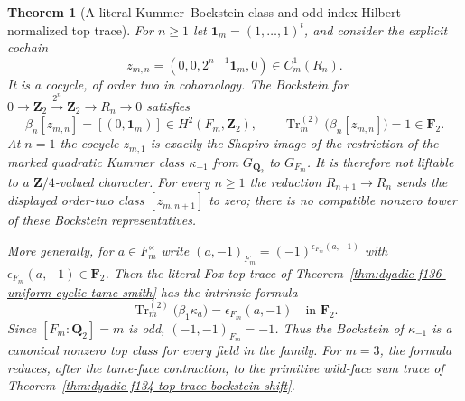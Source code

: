 \documentclass[11pt]{article}
\newtheorem{theorem}{Theorem}[section]
\theoremstyle{definition}
\begin{document}
\begin{theorem}[A literal Kummer--Bockstein class and odd-index
Hilbert-normalized top trace]
\label{thm:dyadic-f137-kummer-bockstein-hilbert}
For $n\ge1$ let $\mathbf1_m=(1,\ldots,1)^t$,
and consider the explicit cochain
\begin{equation}\label{eq:dyadic-f137-bockstein-cocycle}
\boxed{
z_{m,n}=
(0,0,2^{n-1}\mathbf1_m,0)
\in C^1_m(R_n).
}
\end{equation}
It is a cocycle, of order two in cohomology.
The Bockstein for
$0\to\mathbf Z_2\xrightarrow{2^n}\mathbf Z_2
\to R_n\to0$ satisfies
\begin{equation}\label{eq:dyadic-f137-bockstein-top-generator}
\boxed{
\beta_n[z_{m,n}]
=[(0,\mathbf1_m)]
\in H^2(F_m,\mathbf Z_2),\qquad
\operatorname{Tr}^{(2)}_m\bigl(\beta_n[z_{m,n}]\bigr)
=1\in\mathbf F_2 .
}
\end{equation}
At $n=1$ the cocycle $z_{m,1}$ is
\emph{exactly} the Shapiro image of the
restriction of the marked quadratic Kummer
class $\kappa_{-1}$ from $G_{\mathbf Q_2}$
to $G_{F_m}$.  It is therefore not liftable
to a $\mathbf Z/4$-valued character.
For every $n\ge1$ the reduction
$R_{n+1}\to R_n$ sends the displayed
order-two class $[z_{m,n+1}]$ to zero;
there is no compatible nonzero tower of
these Bockstein representatives.

More generally, for $a\in F_m^\times$ write
$(a,-1)_{F_m}=(-1)^{\epsilon_{F_m}(a,-1)}$
with $\epsilon_{F_m}(a,-1)\in\mathbf F_2$.
Then the \emph{literal} Fox top trace
of Theorem~\ref{thm:dyadic-f136-uniform-cyclic-tame-smith}
has the intrinsic formula
\begin{equation}\label{eq:dyadic-f137-hilbert-bockstein-trace}
\boxed{\quad
\operatorname{Tr}^{(2)}_m\bigl(
 \beta_1\kappa_a\bigr)
=\epsilon_{F_m}(a,-1)
\quad\text{in }\mathbf F_2 .
\quad}
\end{equation}
Since $[F_m:\mathbf Q_2]=m$ is odd,
$(-1,-1)_{F_m}=-1$.
Thus the Bockstein of $\kappa_{-1}$
is a canonical nonzero top class for
every field in the family.
For $m=3$, the formula reduces,
after the tame-face contraction,
to the primitive wild-face sum trace
of Theorem~\ref{thm:dyadic-f134-top-trace-bockstein-shift}.
\end{theorem}
\end{document}
